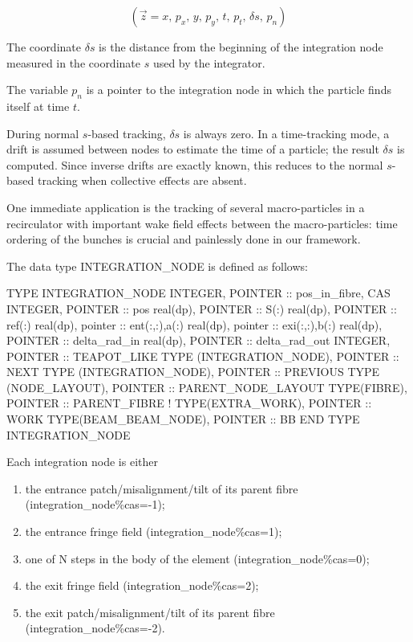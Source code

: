 \[
(\vec{z}=x,\, p_{x},\, y,\, p_{y},\, t,\, p_{t},\,\delta s,\, p_{n})\]

The coordinate $\delta s$ is the distance from the beginning
of the integration node measured in the coordinate $s$ used by the integrator.

The variable $p_n$ is a pointer to the integration node in which the particle
finds itself at time $t$.

During normal $s$-based tracking, $\delta s$ is always zero.
In a time-tracking mode, a drift is assumed between nodes to estimate the time
of a particle; the result $\delta s$ is computed. Since inverse drifts
are exactly known, this reduces to the normal $s$-based tracking when collective
effects are absent.

One immediate application is the tracking of several macro-particles in a recirculator
with important wake field effects between the macro-particles: time ordering of the
bunches is crucial and painlessly done in our framework.


The data type INTEGRATION_NODE is defined as follows:

\begin{ptccode}
TYPE INTEGRATION_NODE
  INTEGER, POINTER :: pos_in_fibre, CAS
  INTEGER, POINTER ::  pos
  real(dp), POINTER :: S(:)
  real(dp), POINTER :: ref(:)
  real(dp), pointer :: ent(:,:),a(:)
  real(dp), pointer :: exi(:,:),b(:)
  real(dp), POINTER :: delta_rad_in
  real(dp), POINTER :: delta_rad_out
  INTEGER, POINTER :: TEAPOT_LIKE
  TYPE (INTEGRATION_NODE), POINTER :: NEXT
  TYPE (INTEGRATION_NODE), POINTER :: PREVIOUS
  TYPE (NODE_LAYOUT), POINTER :: PARENT_NODE_LAYOUT
  TYPE(FIBRE), POINTER :: PARENT_FIBRE
  !   TYPE(EXTRA_WORK), POINTER :: WORK
  TYPE(BEAM_BEAM_NODE), POINTER :: BB
END TYPE INTEGRATION_NODE
\end{ptccode}

Each integration node is either

\begin{enumerate}
  \item the entrance patch/misalignment/tilt of its parent fibre (integration_node\%cas=-1);
  \item the entrance fringe field (integration_node\%cas=1);
  \item one of N steps in the body of the element (integration_node\%cas=0);
  \item the exit fringe field (integration_node\%cas=2);
  \item the exit patch/misalignment/tilt of its parent fibre (integration_node\%cas=-2).
\end{enumerate}

